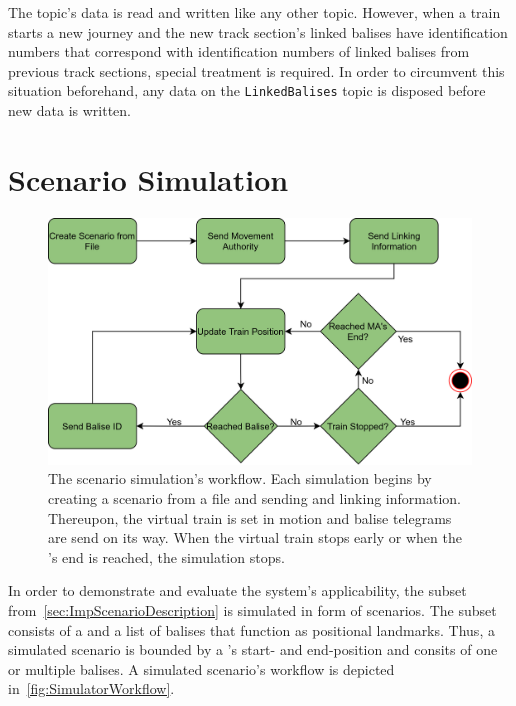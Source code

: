 The topic's data is read and written like any other  topic.
However, when a train starts a new journey and the new track section's linked balises have identification numbers that correspond with identification numbers of linked balises from previous track sections, special treatment is required.
In order to circumvent this situation beforehand, any data on the \texttt{LinkedBalises} topic is disposed before new data is written.

\section{Scenario Simulation}
\label{subsec:ScenarioSimulation}

\begin{figure}[!hb]
	\centering
	\includegraphics[width=0.75\linewidth]{images/SimulatorWorkflow}
	\caption{The scenario simulation's workflow. Each simulation begins by creating a scenario from a file and sending  and linking information. Thereupon, the virtual train is set in motion and balise telegrams are send on its way. When the virtual train stops early or when the 's end is reached, the simulation stops.}
	\label{fig:SimulatorWorkflow}
\end{figure}

In order to demonstrate and evaluate the system's applicability, the  subset from~\autoref{sec:ImpScenarioDescription} is simulated in form of scenarios.
The  subset consists of a  and a list of balises that function as positional landmarks.
Thus, a simulated scenario is bounded by a 's start- and end-position and consits of one or multiple balises.
A simulated scenario's workflow is depicted in~\autoref{fig:SimulatorWorkflow}.

